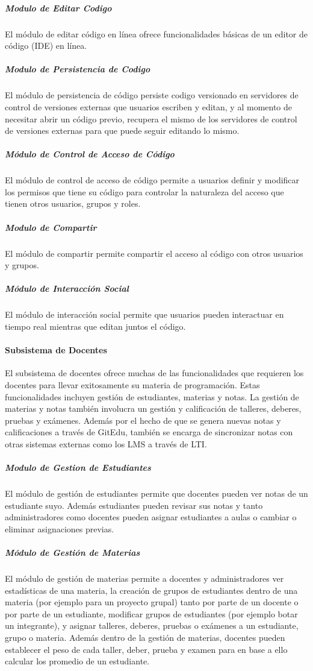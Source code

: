\subparagraph{Modulo de Editar Codigo}
El módulo de editar código en línea ofrece funcionalidades básicas de un editor de código (IDE) en línea.

\subparagraph{Modulo de Persistencia de Codigo}
El módulo de persistencia de código persiste codigo versionado en servidores de control de versiones externas que usuarios escriben y editan, y al momento de necesitar abrir un código previo, recupera el mismo de los servidores de control de versiones externas para que puede seguir editando lo mismo.

\subparagraph{Módulo de Control de Acceso de Código}
El módulo de control de acceso de código permite a usuarios definir y modificar los permisos que tiene su código para controlar la naturaleza del acceso que tienen otros usuarios, grupos y roles.

\subparagraph{Modulo de Compartir}
El módulo de compartir permite compartir el acceso al código con otros usuarios y grupos.

\subparagraph{Módulo de Interacción Social}
El módulo de interacción social permite que usuarios pueden interactuar en tiempo real mientras que editan juntos el código.

\paragraph{Subsistema de Docentes}
El subsistema de docentes ofrece muchas de las funcionalidades que requieren los docentes para llevar exitosamente su materia de programación. Estas funcionalidades incluyen gestión de estudiantes, materias y notas. La gestión de materias y notas también involucra un gestión y calificación de talleres, deberes, pruebas y exámenes. Además por el hecho de que se genera nuevas notas y calificaciones a través de GitEdu, también se encarga de sincronizar notas con otras sistemas externas como los LMS a través de LTI.

\subparagraph{Modulo de Gestion de Estudiantes}
El módulo de gestión de estudiantes permite que docentes pueden ver notas de un estudiante suyo. Además estudiantes pueden revisar sus notas y tanto administradores como docentes pueden asignar estudiantes a aulas o cambiar o eliminar asignaciones previas.

\subparagraph{Módulo de Gestión de Materias}
El módulo de gestión de materias permite a docentes y administradores ver estadísticas de una materia, la creación de grupos de estudiantes dentro de una materia (por ejemplo para un proyecto grupal) tanto por parte de un docente o por parte de un estudiante, modificar grupos de estudiantes (por ejemplo botar un integrante), y asignar talleres, deberes, pruebas o exámenes a un estudiante, grupo o materia. Además dentro de la gestión de materias, docentes pueden establecer el peso de cada taller, deber, prueba y examen para en base a ello calcular los promedio de un estudiante.

